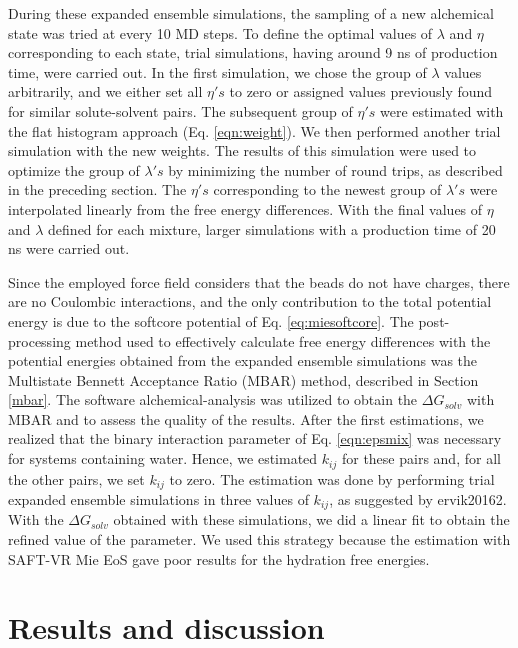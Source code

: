 \documentclass[final,12p,times,twocolumn]{elsarticle}
\begin{document}
	During these expanded ensemble simulations, the sampling of a new alchemical state was tried at every 10 MD steps. To define the optimal values of $\lambda$ and $\eta$ corresponding to each state, trial simulations, having around 9 ns of production time, were carried out. In the first simulation, we chose the group of $\lambda$ values arbitrarily, and we either set all $\eta 's$ to zero or assigned values previously found for similar solute-solvent pairs. The subsequent group of $\eta 's$ were estimated with the flat histogram approach (Eq. \ref{eqn:weight}). We then performed another trial simulation with the new weights. The results of this simulation were used to optimize the group of $\lambda 's$ by minimizing the number of round trips, as described in the preceding  section. The $\eta 's$ corresponding to the newest group of $\lambda 's$ were interpolated linearly from the free energy differences. With the final values of $\eta$ and $\lambda $ defined for each mixture, larger simulations with a production time of 20 ns were carried out.  

	Since the employed force field considers that the beads do not have charges, there are no Coulombic interactions, and the only contribution to the total potential energy is due to the softcore potential of Eq. \ref{eq:miesoftcore}. The post-processing method used to effectively calculate free energy differences with the potential energies obtained from the expanded ensemble simulations was the Multistate Bennett Acceptance Ratio (MBAR) method, described in Section \ref{mbar}. The software alchemical-analysis \cite{klimovich} was utilized to obtain the $\Delta G_{solv}$ with MBAR and to assess the quality of the results. After the first estimations, we realized that the binary interaction parameter of Eq. \ref{eqn:epsmix} was necessary for systems containing water. Hence, we estimated  $k_{ij}$ for these pairs and, for all the other pairs, we set  $k_{ij}$ to zero. The estimation was done by performing trial expanded ensemble simulations in three values of $k_{ij}$, as suggested by ervik20162. With the $\Delta G_{solv}$ obtained with these simulations, we did a linear fit to obtain the refined value of the parameter. We used this strategy because the estimation with SAFT-VR Mie EoS gave poor results for the hydration free energies.
	
	\section{Results and discussion}
	
\end{document}
